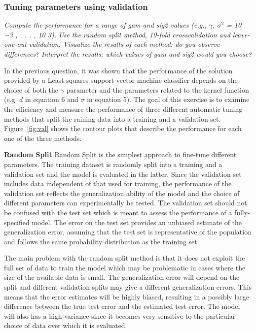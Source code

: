\documentclass{article}
\begin{document}
\subsubsection{Tuning parameters using validation}

\textit{Compute the performance for a range of gam and sig2 values (e.g., $\gamma$, $\sigma^2$ = 10 −3 ,
. . . , 10 3). Use the random split method, 10-fold crossvalidation and leave-one-out
validation. Visualize the results of each method: do you observe differences? Interpret
the results: which values of gam and sig2 would you choose?}



In the previous question, it was shown that the performance of the solution provided by a Least-squares support vector machine classifier depends on the choice of both the $\gamma$ parameter and the parameters related to the kernel function (e.g. $d$ in equation 6 and $\sigma$ in equation 5). The goal of this exercise is to examine the efficiency and measure the performance of three different automatic tuning methods that split the raining data into a training and a validation set. Figure~\ref{fig:val} shows the contour plots that describe the performance for each one of the three methods.

\textbf{Random Split} Random Split is the simplest approach to fine-tune different parameters. The training dataset is randomly split into a training and a validation set and the model is evaluated in the latter.
Since the validation set includes data independent of that used for training, the performance of the validation set reflects the generalization ability of the model and the choice of different parameters can experimentally be tested. The validation set should not be confused with the test set which is meant to assess the performance of a fully-specified model. The error on the test set provides an unbiased estimate of the generalization error, assuming that the test set is representative of the population and follows the same probability distribution as the training set.

The main problem with the random split method is that it does not exploit the full set of data to train the model which may be problematic in cases where the size of the available data is small. The generalization error will depend on the split and different validation splits may give a different generalization errors. This means that the error estimates will be highly biased, resulting in a possibly large difference between the true test error and the estimated test error. The model will also has a high variance since it becomes very sensitive to the particular choice of data over which it is evaluated. 
\end{document}
